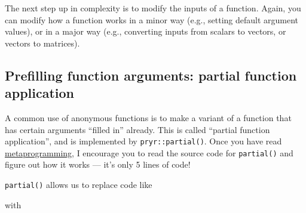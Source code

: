 
The next step up in complexity is to modify the inputs of a function.
Again, you can modify how a function works in a minor way (e.g., setting
default argument values), or in a major way (e.g., converting inputs
from scalars to vectors, or vectors to matrices).

\subsection{Prefilling function arguments: partial function application}

A common use of anonymous functions is to make a variant of a function
that has certain arguments ``filled in'' already. This is called
``partial function application'', and is implemented by
\texttt{pryr::partial()}. Once you have read
\hyperref[metaprogramming]{metaprogramming}, I encourage you to read the
source code for \texttt{partial()} and figure out how it works --- it's
only 5 lines of code!  

\texttt{partial()} allows us to replace code like

\begin{Shaded}
\begin{Highlighting}[]
\StringTok{ } \NormalTok{)}
\StringTok{ }\NormalTok{(}
\end{Highlighting}
\end{Shaded}

with

\begin{Shaded}
\begin{Highlighting}[]
\StringTok{ } \NormalTok{)}
\StringTok{ }
\NormalTok{(} 
\end{Highlighting}
\end{Shaded}

